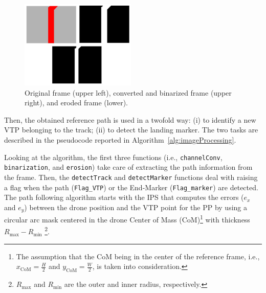 \documentclass[a4paper,twocolumn,10pt]{article}
\begin{document}
    \begin{figure}
        \centering
        \includegraphics[width=0.49\textwidth]{pics/fig6_track.jpg}
        \caption{Original frame (upper left),  converted and binarized frame (upper right), and eroded frame (lower).}
        \label{fig:preprocessing}
    \end{figure}

    Then, the obtained reference path is used in a twofold way: (i) to identify a new VTP belonging to the track; (ii) to detect the landing marker. The two tasks are described in the 
    pseudocode reported in Algorithm~\ref{alg:imageProcessing}.

    Looking at the algorithm, the first three functions (i.e., \texttt{channelConv}, \texttt{binarization}, and \texttt{erosion}) take care of extracting the path information from the frame. Then, the \texttt{detectTrack} and \texttt{detectMarker} functions deal with raising a flag when the path (\texttt{Flag\_VTP}) or the End-Marker (\texttt{Flag\_marker}) are detected. The path following algorithm starts with the IPS that computes the errors ($e_x$ and $e_y$) between the drone position and the VTP point for the PP by using a circular arc mask centered in the 
    drone Center of Mass (CoM)\footnote{The assumption that the CoM being in the center of the reference 
    frame, i.e., $x_\mathrm{CoM} = \frac{H}{2}$ and $y_\mathrm{CoM}=\frac{W}{2}$, is taken into consideration.} with thickness $R_\mathrm{max} - R_\mathrm{min}$
    \footnote{$R_\mathrm{max}$ and $R_\mathrm{min}$ are the outer and inner radius, respectively.}. 
\end{document}
